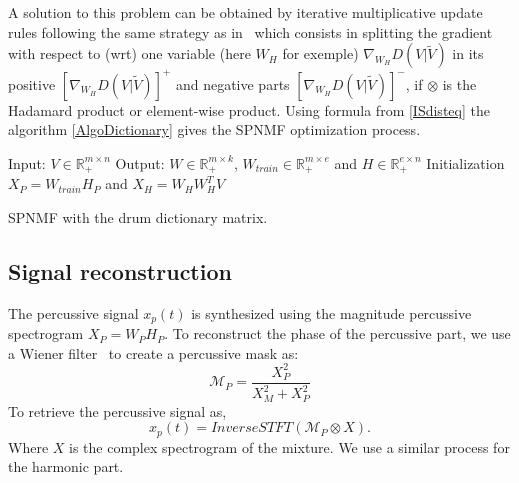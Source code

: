\documentclass{article}
\begin{document}
A solution to this problem can be obtained by iterative multiplicative update rules following the same strategy as in~\cite{yuanOja2005,Lee01algorithmsfor} which consists in splitting the gradient with respect to (wrt) one variable (here $W_H$ for exemple) $\nabla_{W_H} D(V|\tilde{V})$ in its positive $[\nabla_{W_H} D(V|\tilde{V})]^{+}$ and negative parts $[\nabla_{W_H} D(V|\tilde{V})]^{-}$, if $\otimes$ is the Hadamard product or element-wise product. Using formula from \ref{ISdisteq} the algorithm \ref{AlgoDictionary} gives the SPNMF optimization process.
 
\begin{algorithm}[h]
 Input: $V \in \mathbb{R}_{+}^{m \times n} $
 Output: $W \in \mathbb{R}_{+}^{m \times k}$, $W_{train} \in \mathbb{R}_+^{m \times e}$ and $H \in \mathbb{R}_{+}^{e \times n}$
 Initialization\;
 $ X_P = W_{train}H_P $ and
 $ X_H = W_HW_H^TV $ 
  
\vspace{0.2cm}
 \caption{SPNMF with the drum dictionary matrix.}\label{AlgoDictionary}
\end{algorithm}




 
\subsection{Signal reconstruction}

The percussive signal $x_p(t)$ is synthesized using the magnitude percussive spectrogram $X_P = W_PH_P$. To reconstruct the phase of the percussive part, we use a Wiener filter~\cite{liutkus2015generalized} to create a percussive mask as:
\begin{equation}
\mathcal{M}_P = \frac{X_P^2}{X_M^2 + X_P^2}
\end{equation} 
To retrieve the percussive signal as, 
\begin{equation}
x_p(t) = InverseSTFT(\mathcal{M}_P \otimes X).
\end{equation}
Where $X$ is the complex spectrogram of the mixture.
We use a similar process for the harmonic part.
%
\end{document}
